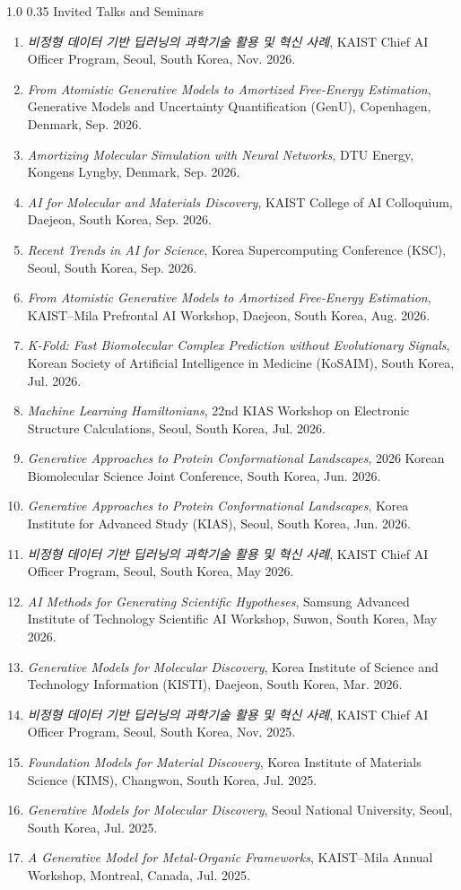 \documentclass[11pt]{article}
\makeatletter
\newcommand{\cventry}[3]{%
  \item \textit{#1}, #2, #3.%
}
\renewcommand{\section}{\@startsection{section}{1}{0pt}%
  {1.0\baselineskip}%
  {0.35\baselineskip}%
  {\Large\bfseries}}
\makeatother
\begin{document}
\section{Invited Talks and Seminars}
\begingroup
\setlength{\emergencystretch}{2em}
\begin{enumerate}
\cventry{비정형 데이터 기반 딥러닝의 과학기술 활용 및 혁신 사례}{KAIST Chief AI Officer Program, Seoul, South Korea}{Nov. 2026}
\cventry{From Atomistic Generative Models to Amortized Free-Energy Estimation}{Generative Models and Uncertainty Quantification (GenU), Copenhagen, Denmark}{Sep. 2026}
\cventry{Amortizing Molecular Simulation with Neural Networks}{DTU Energy, Kongens Lyngby, Denmark}{Sep. 2026}
\cventry{AI for Molecular and Materials Discovery}{KAIST College of AI Colloquium, Daejeon, South Korea}{Sep. 2026}
\cventry{Recent Trends in AI for Science}{Korea Supercomputing Conference (KSC), Seoul, South Korea}{Sep. 2026}
\cventry{From Atomistic Generative Models to Amortized Free-Energy Estimation}{KAIST--Mila Prefrontal AI Workshop, Daejeon, South Korea}{Aug. 2026}
\cventry{K-Fold: Fast Biomolecular Complex Prediction without Evolutionary Signals}{Korean Society of Artificial Intelligence in Medicine (KoSAIM), South Korea}{Jul. 2026}
\cventry{Machine Learning Hamiltonians}{22nd KIAS Workshop on Electronic Structure Calculations, Seoul, South Korea}{Jul. 2026}
\cventry{Generative Approaches to Protein Conformational Landscapes}{2026 Korean Biomolecular Science Joint Conference, South Korea}{Jun. 2026}
\cventry{Generative Approaches to Protein Conformational Landscapes}{Korea Institute for Advanced Study (KIAS), Seoul, South Korea}{Jun. 2026}
\cventry{비정형 데이터 기반 딥러닝의 과학기술 활용 및 혁신 사례}{KAIST Chief AI Officer Program, Seoul, South Korea}{May 2026}
\cventry{AI Methods for Generating Scientific Hypotheses}{Samsung Advanced Institute of Technology Scientific AI Workshop, Suwon, South Korea}{May 2026}
\cventry{Generative Models for Molecular Discovery}{Korea Institute of Science and Technology Information (KISTI), Daejeon, South Korea}{Mar. 2026}
\cventry{비정형 데이터 기반 딥러닝의 과학기술 활용 및 혁신 사례}{KAIST Chief AI Officer Program, Seoul, South Korea}{Nov. 2025}
\cventry{Foundation Models for Material Discovery}{Korea Institute of Materials Science (KIMS), Changwon, South Korea}{Jul. 2025}
\cventry{Generative Models for Molecular Discovery}{Seoul National University, Seoul, South Korea}{Jul. 2025}
\cventry{A Generative Model for Metal-Organic Frameworks}{KAIST--Mila Annual Workshop, Montreal, Canada}{Jul. 2025}

\end{enumerate}
\end{document}
